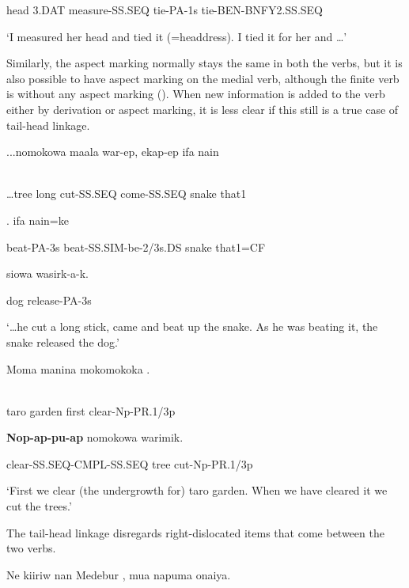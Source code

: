 head  3.DAT  measure-SS.SEQ  tie-PA-1s  tie-BEN-BNFY2.SS.SEQ

`I measured her head and tied it (=headdress). I tied it for her and {\dots}'

 Similarly, the aspect marking normally stays the same in both the verbs, but it is also possible to have aspect marking on the medial verb, although the finite verb is without any aspect marking (). When new information is added to the verb either by derivation or aspect marking, it is less clear if this still is a true case of tail-head linkage.  

\ea%
\label{ex:x1516}
\gll ...nomokowa  maala  war-ep,  ekap-ep  ifa  nain  \\
      \\
\glt
\z

{\dots}tree  long  cut-SS.SEQ  come-SS.SEQ  snake  that1

.    ifa  nain=ke

beat-PA-3s  beat-SS.SIM-be-2/3s.DS  snake  that1=CF

siowa  wasirk-a-k.

dog  release-PA-3s

`{\dots}he cut a long stick, came and beat up the snake. As he was beating it, the snake released the dog.'

\ea%
\label{ex:x1517}
\gll Moma  manina  mokomokoka  \textstyleEmphasizedVernacularWords{-}\textstyleEmphasizedVernacularWords{-}. \\
      \\
\glt
\z

taro  garden  first  clear-Np-PR.1/3p

\textbf{Nop}\textbf{-}\textbf{ap-pu}\textbf{-}\textbf{ap}  nomokowa  warimik.

clear-SS.SEQ-CMPL-SS.SEQ  tree  cut-Np-PR.1/3p

`First we clear (the undergrowth for) taro garden. When we have cleared it we cut the trees.'

The tail-head linkage disregards right-dislocated items that come between the two verbs. 

\ea%
\label{ex:x1518}
\gll Ne  kiiriw  nan  Medebur  ,  mua  napuma  onaiya. \\
      \\
\glt
\z

